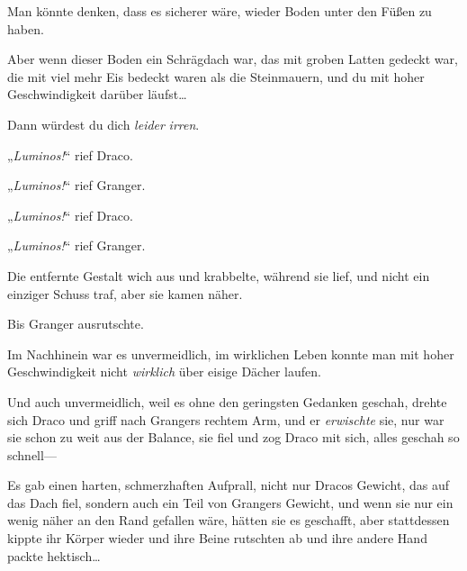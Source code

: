 Man könnte denken, dass es sicherer wäre, wieder Boden unter den Füßen zu haben.

Aber wenn dieser Boden ein Schrägdach war, das mit groben Latten gedeckt war, die mit viel mehr Eis bedeckt waren als die Steinmauern, und du mit hoher Geschwindigkeit darüber läufst…

Dann würdest du dich \emph{leider} \emph{irren}.

„\emph{Luminos!}“ rief Draco.

„\emph{Luminos!}“ rief Granger.

„\emph{Luminos!}“ rief Draco.

„\emph{Luminos!}“ rief Granger.

Die entfernte Gestalt wich aus und krabbelte, während sie lief, und nicht ein einziger Schuss traf, aber sie kamen näher.

Bis Granger ausrutschte.

Im Nachhinein war es unvermeidlich, im wirklichen Leben konnte man mit hoher Geschwindigkeit nicht \emph{wirklich} über eisige Dächer laufen.

Und auch unvermeidlich, weil es ohne den geringsten Gedanken geschah, drehte sich Draco und griff nach Grangers rechtem Arm, und er \emph{erwischte} sie, nur war sie schon zu weit aus der Balance, sie fiel und zog Draco mit sich, alles geschah so schnell—

Es gab einen harten, schmerzhaften Aufprall, nicht nur Dracos Gewicht, das auf das Dach fiel, sondern auch ein Teil von Grangers Gewicht, und wenn sie nur ein wenig näher an den Rand gefallen wäre, hätten sie es geschafft, aber stattdessen kippte ihr Körper wieder und ihre Beine rutschten ab und ihre andere Hand packte hektisch…

